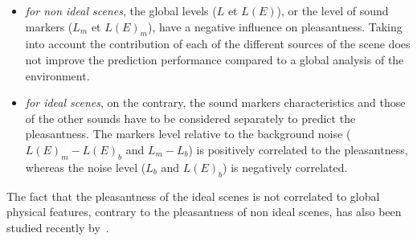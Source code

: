 \documentclass[12pt]{elsarticle}
\newcommand{\cf}{cf.}
\begin{document}
\begin{itemize}
\begin{itemize}
\item \emph{for non ideal scenes}, the global levels ($L$ et $L(E)$), or the level of sound markers ($L_m$ et $L(E)_{m}$), have a negative influence on pleasantness. Taking into account the contribution of each of the different sources of the scene does not improve the prediction performance compared to a global analysis of the environment.


\item \emph{for ideal scenes}, on the contrary, the sound markers characteristics and those of the other sounds have to be considered separately to predict  the pleasantness. The markers level relative to the background noise ($L(E)_m-L(E)_b$ and $L_m-L_b$) is positively correlated to the pleasantness, whereas the noise level ($L_b$ and $L(E)_b$) is negatively correlated.

\end{itemize}
\end{itemize}


The fact that the pleasantness of the ideal scenes is not correlated to global physical features, contrary to the pleasantness of non ideal scenes, has also been studied recently by~\cite{gozalo2015relationship}.

\end{document}
